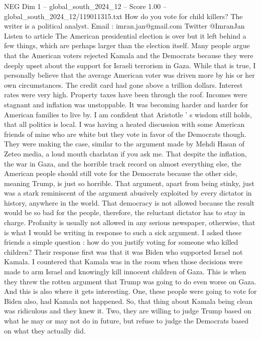 \begin{textsample}{NEG Dim 1 – global\_south\_2024\_12 – Score 1.00 – global\_south\_2024\_12/119011315.txt}  \label{ex:f1_neg_348}
How do you vote for child killers?
The writer is a political analyst.
Email : imran.jan@gmail.com Twitter @ImranJan Listen to article The American presidential election is over but it left behind a few things, which are perhaps larger than the election itself.
Many people argue that the American voters rejected Kamala and the Democrats because they were deeply upset about the support for Israeli terrorism in Gaza.
While that is true, I personally believe that the average American voter was driven more by his or her own circumstances.
The credit card had gone above a trillion dollars.
Interest rates were very high.
Property taxes have been through the roof.
Incomes were stagnant and inflation was unstoppable.
It was becoming harder and harder for American families to live by.
I am confident that Aristotle ' s wisdom still holds, that all politics is local.
I was having a heated discussion with some American friends of mine who are white but they vote in favor of the Democrats though.
They were making the case, similar to the argument made by Mehdi Hasan of Zeteo media, a loud mouth charlatan if you ask me.
That despite the inflation, the war in Gaza, and the horrible track record on almost everything else, the American people should still vote for the Democrats because the other side, meaning Trump, is just so horrible.
That argument, apart from being stinky, just was a stark reminiscent of the argument abusively exploited by every dictator in history, anywhere in the world.
That democracy is not allowed because the result would be so bad for the people, therefore, the reluctant dictator has to stay in charge.
Profanity is usually not allowed in any serious newspaper, otherwise, that is what I would be writing in response to such a sick argument.
I asked these friends a simple question : how do you justify voting for someone who killed children?
Their response first was that it was Biden who supported Israel not Kamala.
I countered that Kamala was in the room when those decisions were made to arm Israel and knowingly kill innocent children of Gaza.
This is when they threw the rotten argument that Trump was going to do even worse on Gaza.
And this is also where it gets interesting.
One, these people were going to vote for Biden also, had Kamala not happened.
So, that thing about Kamala being clean was ridiculous and they knew it.
Two, they are willing to judge Trump based on what he may or may not do in future, but refuse to judge the Democrats based on what they actually did.

\end{textsample}
